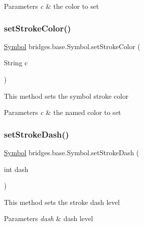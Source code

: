 \begin{DoxyParams}{Parameters}
{\em c} & the color to set \\
\hline
\end{DoxyParams}
\mbox{\label{classbridges_1_1base_1_1_symbol_ae9aa7d4e9b497875017a9b6e0eaab181}} 
\subsubsection{\texorpdfstring{set\+Stroke\+Color()}{setStrokeColor()}\hspace{0.1cm}{\footnotesize\ttfamily [2/2]}}
{\footnotesize\ttfamily \hyperlink{classbridges_1_1base_1_1_symbol}{Symbol} bridges.\+base.\+Symbol.\+set\+Stroke\+Color (\begin{DoxyParamCaption}\item[{String}]{c }\end{DoxyParamCaption})}

This method sets the symbol stroke color


\begin{DoxyParams}{Parameters}
{\em c} & the named color to set \\
\hline
\end{DoxyParams}
\mbox{\label{classbridges_1_1base_1_1_symbol_ad36224ec7cb588dbbaa8040ef59ffbfc}} 
\subsubsection{\texorpdfstring{set\+Stroke\+Dash()}{setStrokeDash()}}
{\footnotesize\ttfamily \hyperlink{classbridges_1_1base_1_1_symbol}{Symbol} bridges.\+base.\+Symbol.\+set\+Stroke\+Dash (\begin{DoxyParamCaption}\item[{int}]{dash }\end{DoxyParamCaption})}

This method sets the stroke dash level


\begin{DoxyParams}{Parameters}
{\em dash} & dash level \\
\hline
\end{DoxyParams}
\mbox{\label{classbridges_1_1base_1_1_symbol_a68f46f0e555e916c59a69d2b3e9e495d}} 
